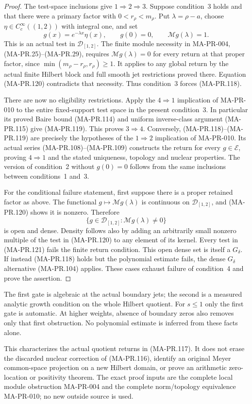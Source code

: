 \begin{proof}
The test-space inclusions give \(1\Rightarrow2\Rightarrow3\).
Suppose condition~3 holds and that there were a primary
factor with \(0<r_\rho<m_\rho\).  Put
\(\lambda=\rho-a\), choose
\(\eta\in C_c^\infty((1,2))\) with integral one, and set
\[
              g(x)=e^{-\lambda x}\eta(x),
              \qquad g(0)=0,\qquad
              \mathcal Mg(\lambda)=1.
 \tag{MA-PR.120}
\]
This is an actual test in \(\mathcal D_{[1,2]}\).
The finite module necessity in MA-PR-004,
(MA-PR.25)--(MA-PR.29), requires
\(\mathcal Mg(\lambda)=0\) for every return at that
proper factor, since \(\min(m_\rho-r_\rho,r_\rho)\ge1\).
It applies to any global return by the actual finite
Hilbert block and full smooth jet restrictions proved
there.  Equation (MA-PR.120) contradicts that necessity.
Thus condition~3 forces (MA-PR.118).

There are now no eligibility restrictions.  Apply the
\(4\Rightarrow1\) implication of MA-PR-010 to the
entire fixed-support test space in the present condition~3.
In particular its proved Baire bound (MA-PR.114) and
uniform inverse-class argument (MA-PR.115) give
(MA-PR.119).  This proves \(3\Rightarrow4\).
Conversely, (MA-PR.118)--(MA-PR.119) are precisely the
hypotheses of the \(1\Rightarrow2\) implication of
MA-PR-010.  Its actual series (MA-PR.108)--(MA-PR.109)
constructs the return for every \(g\in\mathcal E\),
proving \(4\Rightarrow1\) and the stated uniqueness,
topology and nuclear properties.
The version of condition~2 without \(g(0)=0\) follows
from the same inclusions between conditions~1 and~3.

For the conditional failure statement, first suppose
there is a proper retained factor as above.  The functional
\(g\mapsto\mathcal Mg(\lambda)\) is continuous on
\(\mathcal D_{[1,2]}\), and (MA-PR.120) shows it is
nonzero.  Therefore
\[
       \{g\in\mathcal D_{[1,2]}:
                         \mathcal Mg(\lambda)\ne0\}
 \tag{MA-PR.121}
\]
is open and dense.  Density follows also by adding an
arbitrarily small nonzero multiple of the test in
(MA-PR.120) to any element of its kernel.
Every test in (MA-PR.121) fails the finite return
condition.  This open dense set is itself a
\(G_\delta\).  If instead (MA-PR.118) holds but the
polynomial estimate fails, the dense \(G_\delta\)
alternative (MA-PR.104) applies.  These cases exhaust
failure of condition~4 and prove the assertion.
\end{proof}

The first gate is algebraic at the actual boundary
jets; the second is a measured analytic growth condition
on the whole Hilbert quotient.  For \(s\le1\) only
the first gate is automatic.  At higher weights,
absence of boundary zeros also removes only that
first obstruction.  No polynomial estimate is inferred
from these facts alone.

This characterizes the actual quotient returns in
(MA-PR.117).  It does not erase the discarded nuclear
correction of (MA-PR.116), identify an original Meyer
common-space projection on a new Hilbert domain, or
prove an arithmetic zero-location or positivity theorem.
The exact proof inputs are the complete local module
obstruction MA-PR-004 and the complete norm/topology
equivalence MA-PR-010; no new outside source is used.
